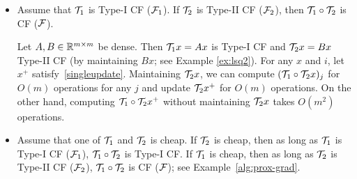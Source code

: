 \begin{itemize}
\item Assume that ${\mathcal{T}}_1$ is Type-I CF (${\mathcal{F}}_1$). If ${\mathcal{T}}_2$ is Type-II CF (${\mathcal{F}}_2$), then ${\mathcal{T}}_1\circ{\mathcal{T}}_2$ is CF (${\mathcal{F}}$).
\begin{example}\label{den-den}
Let $A,B\in\mathbb{R}^{m\times m}$ be dense. Then ${\mathcal{T}}_1 x=Ax$ is Type-I CF and ${\mathcal{T}}_2 x=Bx$ Type-II CF (by maintaining $Bx$; see {Example \ref{ex:lsq2}}). For any $x$ and $i$, let $x^+$ satisfy~\eqref{singleupdate}. Maintaining ${\mathcal{T}}_2 x$, we can compute $({\mathcal{T}}_1\circ{\mathcal{T}}_2 x)_j$ for $O(m)$ operations for any $j$ and update ${\mathcal{T}}_2 x^+$ for $O(m)$ operations. On the other hand, computing ${\mathcal{T}}_1\circ{\mathcal{T}}_2 x^+$ without maintaining ${\mathcal{T}}_2 x$ takes $O(m^2)$ operations.
\end{example}


\item Assume that one of ${\mathcal{T}}_1$ and ${\mathcal{T}}_2$ is cheap. If ${\mathcal{T}}_2$ is cheap, then as long as ${\mathcal{T}}_1$ is Type-I CF (${\mathcal{F}}_1$), ${\mathcal{T}}_1\circ {\mathcal{T}}_2$ is Type-I CF. If ${\mathcal{T}}_1$ is cheap, then as long as ${\mathcal{T}}_2$ is Type-II CF (${\mathcal{F}}_2$), ${\mathcal{T}}_1\circ {\mathcal{T}}_2$ is CF (${\mathcal{F}}$); see Example~\ref{alg:prox-grad}.
\end{itemize}

